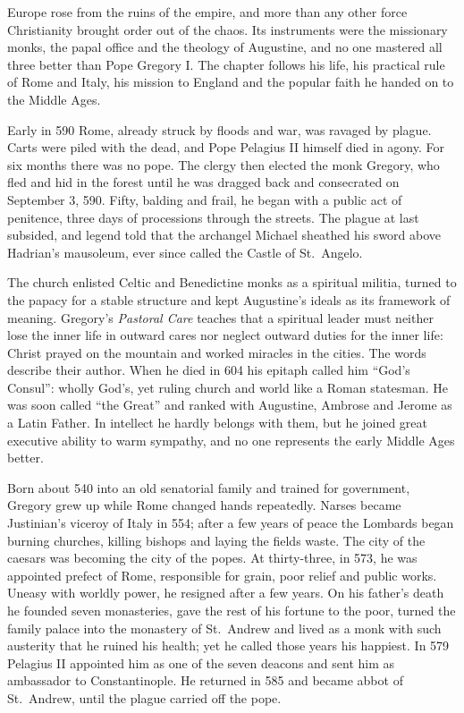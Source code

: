 
\begin{inbrief}
Europe rose from the ruins of the empire, and more than any other force Christianity brought order
out of the chaos. Its instruments were the missionary monks, the papal office and the theology of
Augustine, and no one mastered all three better than Pope Gregory I. The chapter follows his life, his
practical rule of Rome and Italy, his mission to England and the popular faith he handed on to the
Middle Ages.
\end{inbrief}

Early in 590 Rome, already struck by floods and war, was ravaged by plague. Carts were piled with the
dead, and Pope Pelagius II himself died in agony. For six months there was no pope. The clergy then
elected the monk Gregory, who fled and hid in the forest until he was dragged back and consecrated on
September 3, 590. Fifty, balding and frail, he began with a public act of penitence, three days of
processions through the streets. The plague at last subsided, and legend told that the archangel
Michael sheathed his sword above Hadrian's mausoleum, ever since called the Castle of St.~Angelo.

The church enlisted Celtic and Benedictine monks as a spiritual militia, turned to the papacy for a
stable structure and kept Augustine's ideals as its framework of meaning. Gregory's \emph{Pastoral
Care} teaches that a spiritual leader must neither lose the inner life in outward cares nor neglect
outward duties for the inner life: Christ prayed on the mountain and worked miracles in the cities.
The words describe their author. When he died in 604 his epitaph called him ``God's Consul'': wholly
God's, yet ruling church and world like a Roman statesman. He was soon called ``the Great'' and ranked
with Augustine, Ambrose and Jerome as a Latin Father. In intellect he hardly belongs with them, but he
joined great executive ability to warm sympathy, and no one represents the early Middle Ages better.

Born about 540 into an old senatorial family and trained for government, Gregory grew up while Rome
changed hands repeatedly. Narses became Justinian's viceroy of Italy in 554; after a few years of
peace the Lombards began burning churches, killing bishops and laying the fields waste. The city of
the caesars was becoming the city of the popes. At thirty-three, in 573, he was appointed prefect of
Rome, responsible for grain, poor relief and public works. Uneasy with worldly power, he resigned
after a few years. On his father's death he founded seven monasteries, gave the rest of his fortune
to the poor, turned the family palace into the monastery of St.~Andrew and lived as a monk with such
austerity that he ruined his health; yet he called those years his happiest. In 579 Pelagius II appointed him as one of the seven deacons and sent him as ambassador to Constantinople. He returned in 585 and
became abbot of St.~Andrew, until the plague carried off the pope.

